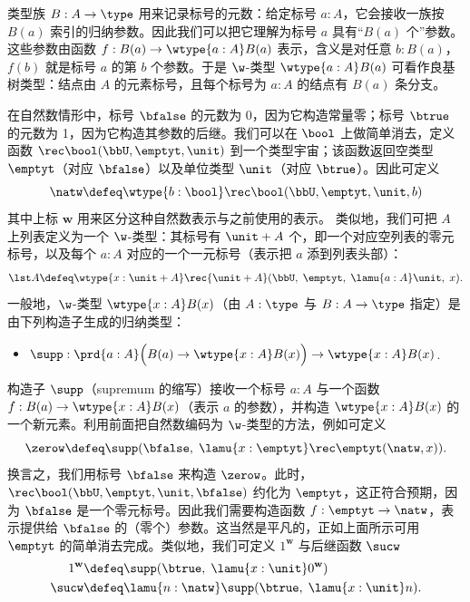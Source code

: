 类型族 $B : A \to \type$ 用来记录标号的元数：给定标号 $a : A$，它会接收一族按 $B(a)$ 索引的归纳参数。因此我们可以把它理解为标号 $a$ 具有“$B(a)$ 个”参数。这些参数由函数 $f : B(a) \to \wtype{a :A} B(a)$ 表示，含义是对任意 $b : B(a)$，$f(b)$ 就是标号 $a$ 的第 $b$ 个参数。于是 $\w$-类型 $\wtype{a :A} B(a)$ 可看作良基树类型：结点由 $A$ 的元素标号，且每个标号为 $a : A$ 的结点有 $B(a)$ 条分支。

在自然数情形中，标号 $\bfalse$ 的元数为 0，因为它构造常量零；标号 $\btrue$ 的元数为 1，因为它构造其参数的后继。我们可以在 $\bool$ 上做简单消去，定义函数 $\rec\bool(\bbU,\emptyt,\unit)$ 到一个类型宇宙；该函数返回空类型 $\emptyt$（对应 $\bfalse$）以及单位类型 $\unit$（对应 $\btrue$）。因此可定义
%
%
\[ \natw \defeq \wtype{b:\bool} \rec\bool(\bbU,\emptyt,\unit,b) \]
其中上标 $\mathbf{w}$ 用来区分这种自然数表示与之前使用的表示。
类似地，我们可把 $A$ 上列表定义为一个 $\w$-类型：其标号有 $\unit + A$ 个，即一个对应空列表的零元标号，以及每个 $a : A$ 对应的一个一元标号（表示把 $a$ 添到列表头部）：
\[ \lst A \defeq \wtype{x: \unit + A} \rec{\unit + A}(\bbU, \; \emptyt, \; \lamu{a:A} \unit,\; x). \]
%
%
%
一般地，$\w$-类型 $\wtype{x:A} B(x)$（由 $A : \type$ 与 $B : A \to \type$ 指定）是由下列构造子生成的归纳类型：
\begin{itemize}
\item \label{defn:supp}
  $\supp : \prd{a:A} \Big(B(a) \to \wtype{x:A} B(x)\Big) \to \wtype{x:A} B(x)$.
\end{itemize}
%
构造子 $\supp$（supremum 的缩写）接收一个标号 $a : A$ 与一个函数 $f : B(a) \to \wtype{x:A} B(x)$（表示 $a$ 的参数），并构造 $\wtype{x:A} B(x)$ 的一个新元素。利用前面把自然数编码为 $\w$-类型的方法，例如可定义
\begin{equation*}
\zerow \defeq \supp(\bfalse, \; \lamu{x:\emptyt} \rec\emptyt(\natw,x)).
\end{equation*}
换言之，我们用标号 $\bfalse$ 来构造 $\zerow$。此时，$\rec\bool(\bbU,\emptyt,\unit, \bfalse)$ 约化为 $\emptyt$，这正符合预期，因为 $\bfalse$ 是一个零元标号。因此我们需要构造函数 $f : \emptyt \to \natw$，表示提供给 $\bfalse$ 的（零个）参数。这当然是平凡的，正如上面所示可用 $\emptyt$ 的简单消去完成。类似地，我们可定义 $1^{\mathbf{w}}$ 与后继函数 $\sucw$
\begin{align*}
1^{\mathbf{w}} &\defeq \supp(\btrue, \; \lamu{x:\unit} 0^{\mathbf{w}}) \\
\sucw&\defeq \lamu{n:\natw} \supp(\btrue, \; \lamu{x:\unit} n).
\end{align*}


